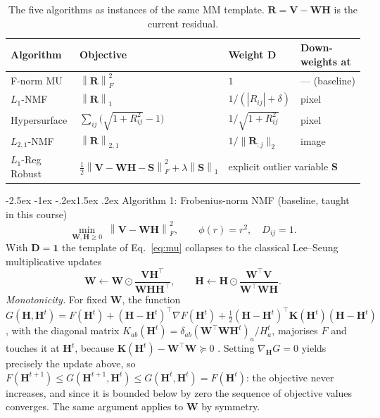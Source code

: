 \documentclass[12pt,a4paper]{article}
\makeatletter
\renewcommand\subsection{\@startsection{subsection}{2}{\z@}%
    {-2.5ex \@plus -1ex \@minus -.2ex}{1.5ex \@plus.2ex}%
    {\normalfont\fontsize{12}{14}\bfseries}}
\newcommand{\bV}{\bm{V}}
\newcommand{\bW}{\bm{W}}
\newcommand{\bH}{\bm{H}}
\newcommand{\bS}{\bm{S}}
\newcommand{\bD}{\bm{D}}
\newcommand{\bR}{\bm{R}}
\newcommand{\bK}{\bm{K}}
\newcommand{\Frob}[1]{\left\lVert #1 \right\rVert_F}
\newcommand{\Lone}[1]{\left\lVert #1 \right\rVert_1}
\newcommand{\Ltwoone}[1]{\left\lVert #1 \right\rVert_{2,1}}
\makeatother
\begin{document}
\begin{table}[tbp]
  \centering
  \caption{The five algorithms as instances of the same MM template.
           $\bR = \bV - \bW\bH$ is the current residual.}
  \label{tab:algorithms}
  \small
  \begin{tabular}{llll}
    \toprule
    Algorithm & Objective & Weight $\bD$ & Down-weights at \\
    \midrule
    F-norm MU      & $\Frob{\bR}^{2}$             & $1$                                  & --- (baseline) \\
    $L_1$-NMF      & $\Lone{\bR}$                 & $1/(|R_{ij}| + \delta)$              & pixel \\
    Hypersurface   & $\sum_{ij}\!\big(\!\sqrt{1+R_{ij}^{2}}-1\big)$ & $1/\sqrt{1+R_{ij}^{2}}$ & pixel \\
    $L_{2,1}$-NMF  & $\Ltwoone{\bR}$              & $1/\lVert \bR_{:j}\rVert_{2}$        & image \\
    $L_1$-Reg Robust & $\tfrac12\Frob{\bV-\bW\bH-\bS}^{2} + \lambda\Lone{\bS}$ & \multicolumn{2}{l}{explicit outlier variable $\bS$} \\
    \bottomrule
  \end{tabular}
\end{table}

\subsection{Algorithm 1: Frobenius-norm NMF (baseline, taught in this course)}
\label{sec:alg-frobenius}
\begin{equation}
  \min_{\bW,\bH \ge 0} \; \Frob{\bV - \bW\bH}^{2},
  \qquad \phi(r) = r^{2}, \quad D_{ij} = 1 .
\end{equation}
With $\bD = \mathbf{1}$ the template of Eq.~\eqref{eq:mu} collapses to the
classical Lee--Seung multiplicative updates
\begin{equation}
  \bW \leftarrow \bW \odot \frac{\bV\bH^{\top}}{\bW\bH\bH^{\top}},
  \qquad
  \bH \leftarrow \bH \odot \frac{\bW^{\top}\bV}{\bW^{\top}\bW\bH} .
\end{equation}
\emph{Monotonicity.} For fixed $\bW$, the function
$G(\bH,\bH^{t}) = F(\bH^{t}) + (\bH-\bH^{t})^{\top}\nabla F(\bH^{t})
+ \tfrac{1}{2}(\bH-\bH^{t})^{\top}\bK(\bH^{t})(\bH-\bH^{t})$, with the
diagonal matrix $K_{ab}(\bH^{t}) = \delta_{ab}(\bW^{\top}\bW\bH^{t})_{a}/H^{t}_{a}$,
majorises $F$ and touches it at $\bH^{t}$, because
$\bK(\bH^{t}) - \bW^{\top}\bW \succeq 0$ \citep{lee2001algorithms}. Setting
$\nabla_{\bH} G = 0$ yields precisely the update above, so
$F(\bH^{t+1}) \le G(\bH^{t+1},\bH^{t}) \le G(\bH^{t},\bH^{t}) = F(\bH^{t})$:
the objective never increases, and since it is bounded below by zero the
sequence of objective values converges. The same argument applies to $\bW$ by
symmetry.
\end{document}
